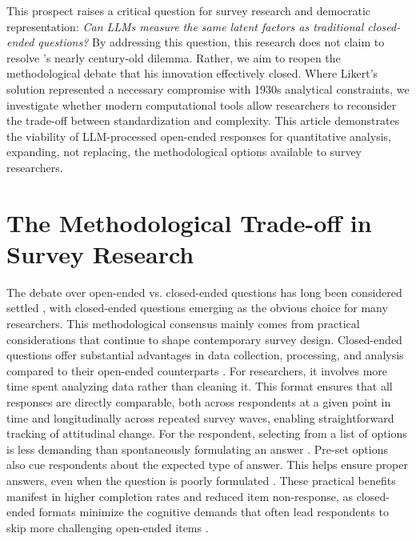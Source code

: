 \documentclass[
  journal=ram,
  manuscript=article-type,
  year=2025,
  volume=unpublished,
]{cup-journal}
\begin{document}
This prospect raises a critical question for survey research and democratic representation:
\textit{Can LLMs measure the same latent factors as traditional closed-ended questions?}
By addressing this question, this research does not claim to resolve \citet{likert32a}'s nearly century-old dilemma.
Rather, we aim to reopen the methodological debate that his innovation effectively closed.
Where Likert's solution represented a necessary compromise with 1930s analytical constraints, we investigate whether modern computational tools allow researchers to reconsider the trade-off between standardization and complexity.
This article demonstrates the viability of LLM-processed open-ended responses for quantitative analysis, expanding, not replacing, the methodological options available to survey researchers.

\section{The Methodological Trade-off in Survey Research}

The debate over open-ended vs. closed-ended questions has long been considered settled \citep{lazarsfeld44}, with closed-ended questions emerging as the obvious choice for many researchers.
This methodological consensus mainly comes from practical considerations that continue to shape contemporary survey design.
Closed-ended questions offer substantial advantages in data collection, processing, and analysis compared to their open-ended counterparts \citep{geer91, schuman_presser80}.
For researchers, it involves more time spent analyzing data rather than cleaning it.
This format ensures that all responses are directly comparable, both across respondents at a given point in time and longitudinally across repeated survey waves, enabling straightforward tracking of attitudinal change.
For the respondent, selecting from a list of options is less demanding than spontaneously formulating an answer \citep{foddy93}.
Pre-set options also cue respondents about the expected type of answer.
This helps ensure proper answers, even when the question is poorly formulated \citep{foddy93}.
These practical benefits manifest in higher completion rates and reduced item non-response, as closed-ended formats minimize the cognitive demands that often lead respondents to skip more challenging open-ended items \citep{couper00, couper01}.
\end{document}
